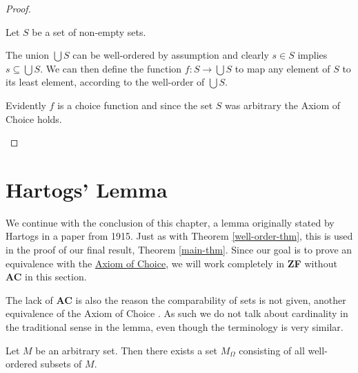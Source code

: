 \documentclass[../../main.tex]{subfiles}
\begin{document}
\begin{proof}
\begin{enumerate}
        Let $S$ be a set of non-empty sets.

        The union $\bigcup S$ can be well-ordered by assumption and clearly $s \in S$ implies $s \subseteq \bigcup S$.
        We can then define the function $f: S \to \bigcup S$ to map any element of $S$ to its least element, according to the well-order of $\bigcup S$.
        
        Evidently $f$ is a choice function and since the set $S$ was arbitrary the Axiom of Choice holds. \qedhere
    \end{enumerate}
\end{proof}

\section{Hartogs' Lemma}\label{hartogs-lemma-section}
We continue with the conclusion of this chapter, a lemma originally stated by Hartogs in a paper from 1915. %
Just as with Theorem \ref{well-order-thm}, this is used in the proof of our final result, Theorem \ref{main-thm}.
Since our goal is to prove an equivalence with the \hyperref[choice-axiom]{Axiom of Choice}, we will work completely in \textbf{ZF} without \textbf{AC} in this section.

The lack of \textbf{AC} is also the reason the comparability of sets is not given, another equivalence of the Axiom of Choice \cite{Har15}.
As such we do not talk about cardinality in the traditional sense in the lemma, even though the terminology is very similar.

\begin{lemma}\label{well-order-set}\cite[Appendix]{Har15}
    Let $M$ be an arbitrary set.
    Then there exists a set $M_\Omega$ consisting of all well-ordered subsets of $M$. 
\end{lemma}
\end{document}
